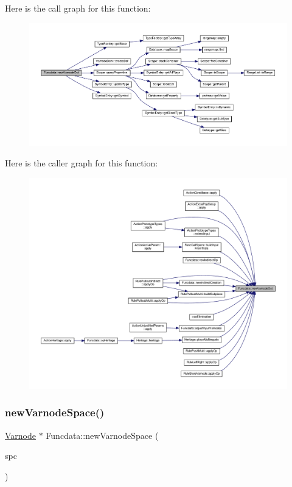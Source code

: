 Here is the call graph for this function\+:
\nopagebreak
\begin{figure}[H]
\begin{center}
\leavevmode
\includegraphics[width=350pt]{class_funcdata_a100e6704e4c245e076170268d31b47ec_cgraph}
\end{center}
\end{figure}
Here is the caller graph for this function\+:
\nopagebreak
\begin{figure}[H]
\begin{center}
\leavevmode
\includegraphics[width=350pt]{class_funcdata_a100e6704e4c245e076170268d31b47ec_icgraph}
\end{center}
\end{figure}
\mbox{\label{class_funcdata_acc9f6fb3e8a36e0e1e633660fc05fdbf}} 
\subsubsection{\texorpdfstring{newVarnodeSpace()}{newVarnodeSpace()}}
{\footnotesize\ttfamily \mbox{\hyperlink{class_varnode}{Varnode}} $\ast$ Funcdata\+::new\+Varnode\+Space (\begin{DoxyParamCaption}\item[{\mbox{\hyperlink{class_addr_space}{Addr\+Space}} $\ast$}]{spc }\end{DoxyParamCaption})}




